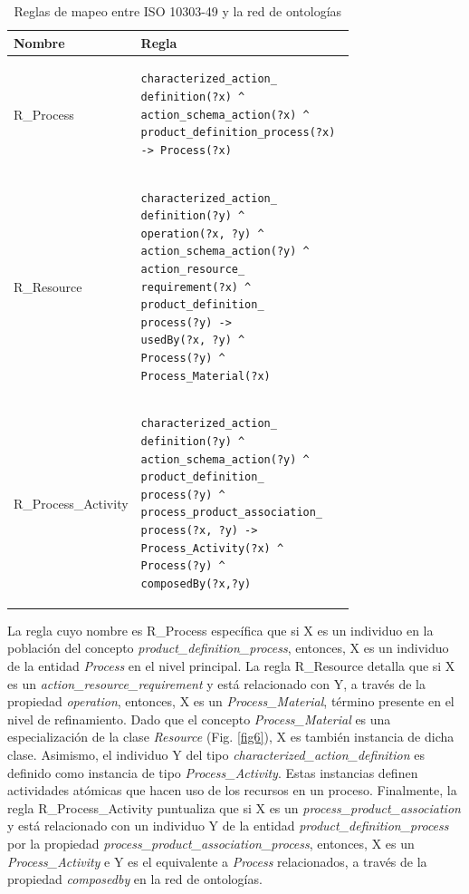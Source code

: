 \documentclass[journal]{IEEEtran}
\begin{document}
\begin{table}[!t]
\renewcommand{\arraystretch}{1.3}
\caption{Reglas de mapeo entre ISO 10303-49 y la red de ontolog\'ias}
\label{tabla6}
\centering
\begin{tabular}{|p{2.5cm}|p{5cm}|}
\hline
\bfseries Nombre & \bfseries Regla \\
\hline
R\_Process & \begin{verbatim}characterized_action_
definition(?x) ^ 
action_schema_action(?x) ^ 
product_definition_process(?x) 
-> Process(?x) \end{verbatim}  \\ \cline{1-2}
R\_Resource & \begin{verbatim}characterized_action_
definition(?y) ^ 
operation(?x, ?y) ^ 
action_schema_action(?y) ^ 
action_resource_
requirement(?x) ^ 
product_definition_
process(?y) -> 
usedBy(?x, ?y) ^ 
Process(?y) ^ 
Process_Material(?x) \end{verbatim} \\ \cline{1-2}
R\_Process\_Activity & \begin{verbatim}characterized_action_
definition(?y) ^ 
action_schema_action(?y) ^ 
product_definition_
process(?y) ^ 
process_product_association_
process(?x, ?y) -> 
Process_Activity(?x) ^ 
Process(?y) ^ 
composedBy(?x,?y) \end{verbatim} \\  \hline   
\end{tabular}
\end{table}

La regla cuyo nombre es R\_Process espec\'ifica que si X es un individuo en la poblaci\'on del concepto \emph{product\_definition\_process}, entonces, X es un individuo de la entidad \emph{Process} en el nivel principal. La regla R\_Resource detalla que si X es un \emph{action\_resource\_requirement} y est\'a relacionado con Y, a trav\'es de la propiedad \emph{operation}, entonces, X es un \emph{Process\_Material}, t\'ermino presente en el nivel de refinamiento. Dado que el concepto \emph{Process\_Material} es una especializaci\'on de la clase \emph{Resource} (Fig. \ref{fig6}), X es tambi\'en instancia de dicha clase. Asimismo, el individuo Y del tipo \emph{characterized\_action\_definition} es definido como instancia de tipo \emph{Process\_Activity}. Estas instancias definen actividades at\'omicas que hacen uso de los recursos en un proceso. Finalmente, la regla R\_Process\_Activity puntualiza que si X es un \emph{process\_product\_association} y est\'a relacionado con un individuo Y de la entidad \emph{product\_definition\_process} por la propiedad \emph{process\_product\_association\_process}, entonces, X es un \emph{Process\_Activity} e Y es el equivalente a \emph{Process} relacionados, a trav\'es de la propiedad \emph{composedby} en la red de ontolog\'ias. 
\end{document}
